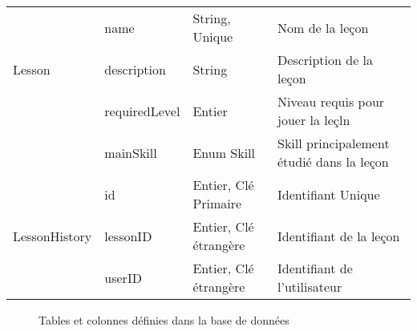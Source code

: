 \begin{longtable}[c]{@{}|p{}|p{}|p{}|p{}|@{}}
														& name                                                 & String, Unique                                                                           & Nom de la leçon                                                                          \\* \cmidrule(l){2-4} 
	\multirow{-3}{*}{Lesson}							& description                                          & String                                                                                   & Description de la leçon                                                                  \\* \cmidrule(l){2-4} 
														& requiredLevel                                        & Entier                                                                                   & Niveau requis pour jouer la leçln                                                        \\* \cmidrule(l){2-4} 
							                            & mainSkill                                            & Enum Skill                                                                               & Skill principalement étudié dans la leçon                                                \\* \midrule
														& id                                                   & Entier, Clé Primaire                                                                     & Identifiant Unique                                                                       \\* \cmidrule(l){2-4} 
	\multirow{-2}{*}{LessonHistory}						& lessonID                                             & Entier, Clé étrangère                                                                    & Identifiant de la leçon                                                                  \\* \cmidrule(l){2-4} 
									                    & userID                                               & Entier, Clé étrangère                                                                    & Identifiant de l'utilisateur                                                             \\* \bottomrule
\end{longtable}
\begin{figure}[H]
	\caption{Tables et colonnes définies dans la base de données}
\end{figure}